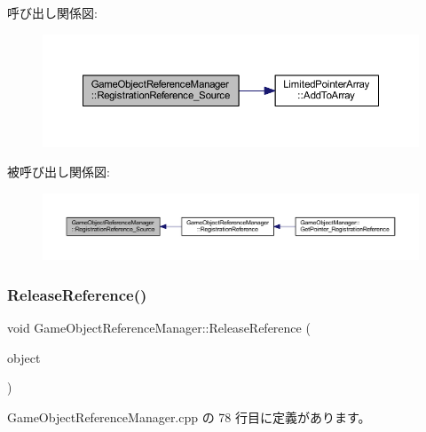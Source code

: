 呼び出し関係図\+:\nopagebreak
\begin{figure}[H]
\begin{center}
\leavevmode
\includegraphics[width=350pt]{class_game_object_reference_manager_aa4ca837b7d576db6b11745b2f8530b4d_cgraph}
\end{center}
\end{figure}
被呼び出し関係図\+:\nopagebreak
\begin{figure}[H]
\begin{center}
\leavevmode
\includegraphics[width=350pt]{class_game_object_reference_manager_aa4ca837b7d576db6b11745b2f8530b4d_icgraph}
\end{center}
\end{figure}
\mbox{\label{class_game_object_reference_manager_ac7d117427de3052f893228408a3de5d7}} 
\subsubsection{\texorpdfstring{Release\+Reference()}{ReleaseReference()}}
{\footnotesize\ttfamily void Game\+Object\+Reference\+Manager\+::\+Release\+Reference (\begin{DoxyParamCaption}\item[{\mbox{\hyperlink{class_game_object_base}{Game\+Object\+Base}} $\ast$}]{object }\end{DoxyParamCaption})}



 Game\+Object\+Reference\+Manager.\+cpp の 78 行目に定義があります。

